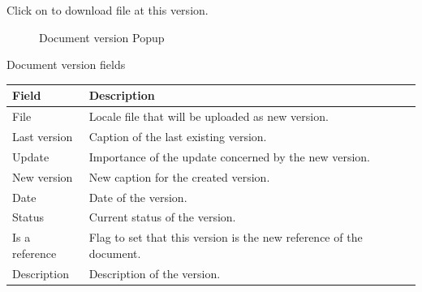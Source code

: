 \documentclass[letterpaper,10pt,english]{sphinxmanual}
\begin{document}
Click on  to download file at this version.
\begin{figure}[htbp]
\centering
\capstart

\caption{Document version Popup}\end{figure}


\begin{threeparttable}
\capstart\caption{Document version fields}
\label{Document:id2}
\begin{tabulary}{\linewidth}{|l|l|}
\hline
\textsf{\relax 
Field
} & \textsf{\relax 
Description
}\\
\hline
File
 & 
Locale file that will be uploaded as new version.
\\
\hline
Last version
 & 
Caption of the last existing version.
\\
\hline
Update
 & 
Importance of the update concerned by the new version.
\\
\hline
New version
 & 
New caption for the created version.
\\
\hline
Date
 & 
Date of the version.
\\
\hline
Status
 & 
Current status of the version.
\\
\hline
Is a reference
 & 
Flag to set that this version is the new reference of the document.
\\
\hline
Description
 & 
Description of the version.
\\
\hline\end{tabulary}

\end{threeparttable}
\end{document}
